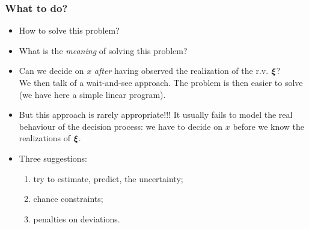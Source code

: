 \documentclass[aspectratio=169]{beamer}
\begin{document}
\begin{frame}
	\frametitle{What to do?}
	
	\begin{itemize}
		\item
		How to solve this problem?
		\item
		What is the {\sl meaning} of solving this problem?
		\item
		Can we decide on $x$ {\sl after} having observed the realization of the r.v. ${\boldsymbol{\xi}}$?\\
		We then talk of a {\red wait-and-see} approach.
		The problem is then easier to solve (we have here a simple linear program).
		\item
		But this approach is rarely appropriate!!! It usually fails to model the
		real behaviour of the decision process: we have to decide on $x$
		{\red before} we know the realizations of ${\boldsymbol{\xi}}$.
		\item
		Three suggestions:
		\begin{enumerate}
			\item
			try to estimate, predict, the uncertainty;
			\item
			chance constraints;
			\item
			penalties on deviations.
		\end{enumerate}
	\end{itemize}
	
\end{frame}
\end{document}
